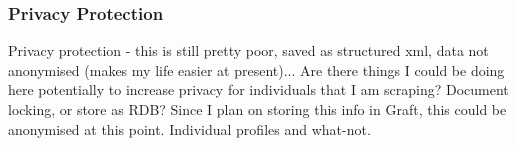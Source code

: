 \subsubsection{Privacy Protection}

Privacy protection - this is still pretty poor, saved as structured xml, data not anonymised (makes my life easier at present)... Are there things I could be doing here potentially to increase privacy for individuals that I am scraping? Document locking, or store as RDB? Since I plan on storing this info in Graft, this could be anonymised at this point. Individual profiles and what-not. 


